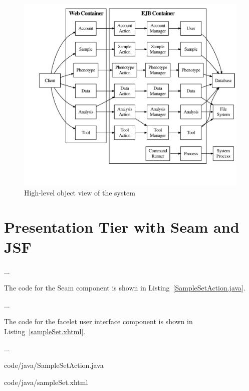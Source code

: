 \begin{landscape}
\begin{figure}[!htpb] 
  \centering
  \includegraphics[width=1.1\textwidth]{diagrams/Architecture2}
  \caption{High-level object view of the system}
  \label{fig:architecture2}
\end{figure}
\end{landscape}





\section{Presentation Tier with Seam and JSF}
\label{sec:ui}

...

The code for the Seam component is shown in
Listing~\ref{SampleSetAction.java}.

...

The code for the facelet user interface component is shown in
Listing~\ref{sampleSet.xhtml}.

...


\begin{singlespace}
   
  {code/java/SampleSetAction.java}
\end{singlespace}

\begin{singlespace}
   
  {code/java/sampleSet.xhtml}
\end{singlespace}





